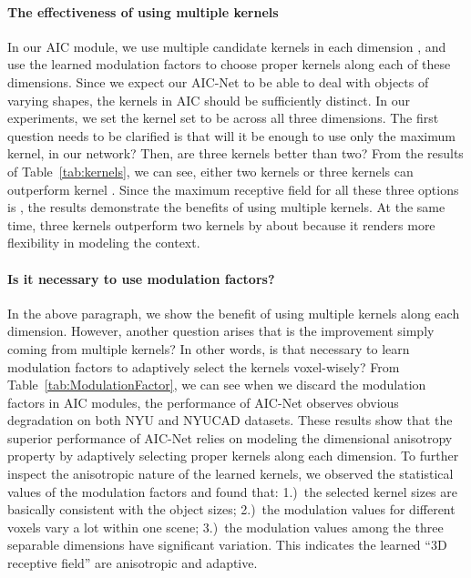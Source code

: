 \vspace{-0.3cm}
\paragraph{The effectiveness of using multiple kernels}
In our AIC module, we use multiple candidate kernels in each dimension , and use the learned modulation factors to choose proper kernels along each of these dimensions. 
Since we expect our AIC-Net to be able to deal with objects of varying shapes, the kernels in AIC should be sufficiently distinct.
In our experiments, we set the kernel set to be  across all three dimensions. 
The first question needs to be clarified is that will it be enough to use only the maximum kernel,  in our network? 
Then, are three kernels better than two? 
From the results of Table~\ref{tab:kernels}, we can see, either two kernels  or three kernels  can outperform kernel . Since the maximum receptive field for all these three options is , the results demonstrate the benefits of using multiple kernels. At the same time, three kernels outperform two kernels by about  because it renders more flexibility in modeling the context.

\vspace{-0.3cm}
\paragraph{Is it necessary to use modulation factors?}
In the above paragraph, we show the benefit of using multiple kernels along each dimension. However, another question arises that is the improvement simply coming from multiple kernels? In other words, is that necessary to learn modulation factors to adaptively select the kernels voxel-wisely? From Table~\ref{tab:ModulationFactor}, we can see when we discard the modulation factors in AIC modules, the performance of AIC-Net observes obvious degradation on both NYU and NYUCAD datasets. These results show that the superior performance of AIC-Net relies on modeling the dimensional anisotropy property by adaptively selecting proper kernels along each dimension.
To further inspect the anisotropic nature of the learned kernels, we observed the statistical values of the modulation factors and found that: 
1.)~the selected kernel sizes are basically consistent with the object sizes; 
2.)~the modulation values for different voxels vary a lot within one scene; 
3.)~the modulation values among the three separable dimensions have significant variation. This indicates the learned ``3D receptive field'' are anisotropic and adaptive. 


